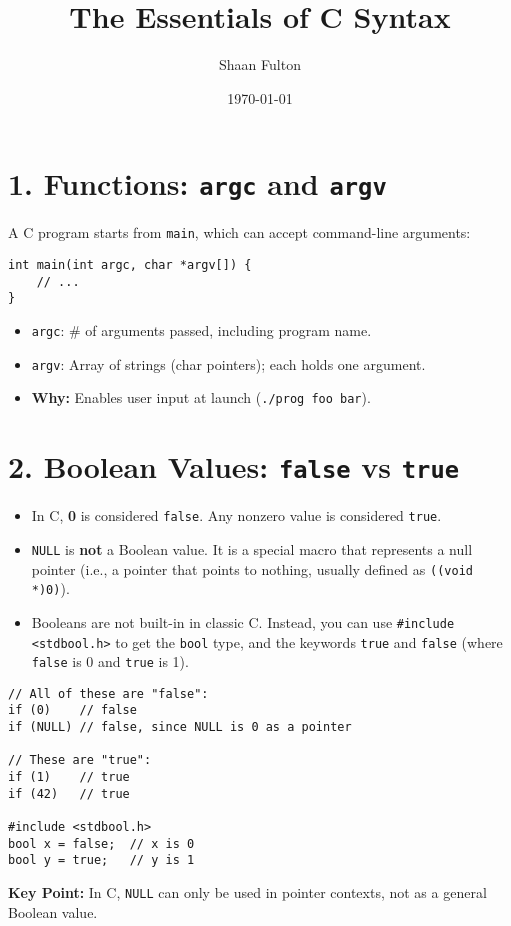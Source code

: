 \documentclass[12pt]{article}
\title{The Essentials of C Syntax}
\author{Shaan Fulton}
\date{\today}
\begin{document}
\maketitle
\section*{1. Functions: \texttt{argc} and \texttt{argv}}

A C program starts from \texttt{main}, which can accept command-line arguments:
\begin{lstlisting}
int main(int argc, char *argv[]) {
    // ...
}
\end{lstlisting}
\begin{itemize}[noitemsep]
  \item \texttt{argc}: \# of arguments passed, including program name.
  \item \texttt{argv}: Array of strings (char pointers); each holds one argument.
  \item \textbf{Why:} Enables user input at launch (\texttt{./prog foo bar}).
\end{itemize}

\section*{2. Boolean Values: \texttt{false} vs \texttt{true}}

\begin{itemize}[noitemsep]
  \item In C, \textbf{0} is considered \texttt{false}. Any nonzero value is considered \texttt{true}.
  \item \texttt{NULL} is \textbf{not} a Boolean value. It is a special macro that represents a null pointer (i.e., a pointer that points to nothing, usually defined as \texttt{((void *)0)}).
  \item Booleans are not built-in in classic C. Instead, you can use \texttt{\#include <stdbool.h>} to get the \texttt{bool} type, and the keywords \texttt{true} and \texttt{false} (where \texttt{false} is 0 and \texttt{true} is 1).
\end{itemize}
\begin{lstlisting}
// All of these are "false":
if (0)    // false
if (NULL) // false, since NULL is 0 as a pointer

// These are "true":
if (1)    // true
if (42)   // true

#include <stdbool.h>
bool x = false;  // x is 0
bool y = true;   // y is 1
\end{lstlisting}
\textbf{Key Point:} In C, \texttt{NULL} can only be used in pointer contexts, not as a general Boolean value.
\end{document}
